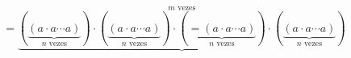 \documentclass[preview]{standalone}
\begin{document}
\begin{align*}
=\underbrace{(\underbrace{(a \cdot a \cdots a)}_{n \text{ vezes}})\cdot(\underbrace{(a \cdot a \cdots a)}_{n \text{ vezes}})\cdot(\underbrace{=(a \cdot a \cdots a)}_{n \text{ vezes}})\cdot(\underbrace{(a \cdot a \cdots a)}_{n \text{ vezes}})}^{m \text{ vezes}}
\end{align*}
\end{document}
